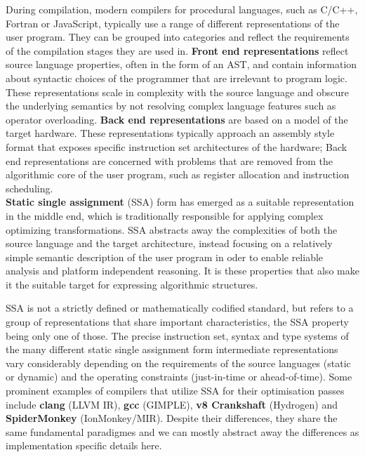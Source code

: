     During compilation, modern compilers for procedural languages, such as
    C/C++, Fortran or JavaScript, typically use a range of different
    representations of the user program.
    They can be grouped into categories and reflect the requirements of
    the compilation stages they are used in.
    \linebreak
    {\bf Front end representations} reflect source language properties,
    often in the form of an AST, and contain information about syntactic choices
    of the programmer that are irrelevant to program logic.
    These representations scale in complexity with the source language and
    obscure the underlying semantics by not resolving complex language features
    such as operator overloading.
    \linebreak
    {\bf Back end representations} are based on a model of the target hardware.
    These representations typically approach an assembly style format that
    exposes specific instruction set architectures of the hardware;
    Back end representations are concerned with problems that are removed from
    the algorithmic core of the user program, such as register allocation and
    instruction scheduling.
    \\
    {\bf Static single assignment} (SSA) form has emerged as a suitable
    representation in the middle end, which is traditionally responsible for
    applying complex optimizing transformations.
    SSA abstracts away the complexities of both the source language and the
    target architecture, instead focusing on a relatively simple semantic
    description of the user program in oder to enable reliable analysis and
    platform independent reasoning.
    It is these properties that also make it the suitable target for expressing
    algorithmic structures.

    SSA is not a strictly defined or mathematically codified standard, but
    refers to a group of representations that share important characteristics,
    the SSA property being only one of those.
    The precise instruction set, syntax and type systems of the many different
    static single assignment form intermediate representations vary considerably
    depending on the requirements of the source languages (static or dynamic)
    and the operating constraints (just-in-time or ahead-of-time).
    Some prominent examples of compilers that utilize SSA for their
    optimisation passes include {\bf clang} (LLVM IR), {\bf gcc} (GIMPLE),
    {\bf v8 Crankshaft} (Hydrogen) and {\bf SpiderMonkey} (IonMonkey/MIR).
    Despite their differences, they share the same fundamental paradigmes
    and we can mostly abstract away the differences as implementation specific
    details here.

